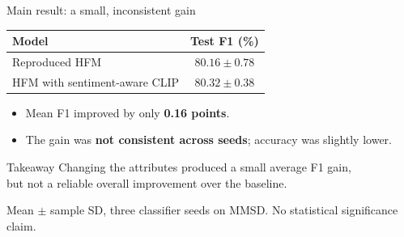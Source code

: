 \documentclass[aspectratio=169,11pt]{beamer}
\begin{document}
\begin{frame}{Main result: a small, inconsistent gain}
\begin{center}
\begin{tabular}{lc}
\toprule
Model & Test F1 (\%) \\
\midrule
Reproduced HFM & $80.16\pm0.78$ \\
HFM with sentiment-aware CLIP & $\mathbf{80.32\pm0.38}$ \\
\bottomrule
\end{tabular}
\end{center}
\begin{itemize}
  \item Mean F1 improved by only \textbf{0.16 points}.
  \item The gain was \textbf{not consistent across seeds}; accuracy was slightly lower.
\end{itemize}
\begin{block}{Takeaway}
Changing the attributes produced a small average F1 gain,\\
but not a reliable overall improvement over the baseline.
\end{block}
{\scriptsize Mean $\pm$ sample SD, three classifier seeds on MMSD. No statistical significance claim.}
\end{frame}
\end{document}
